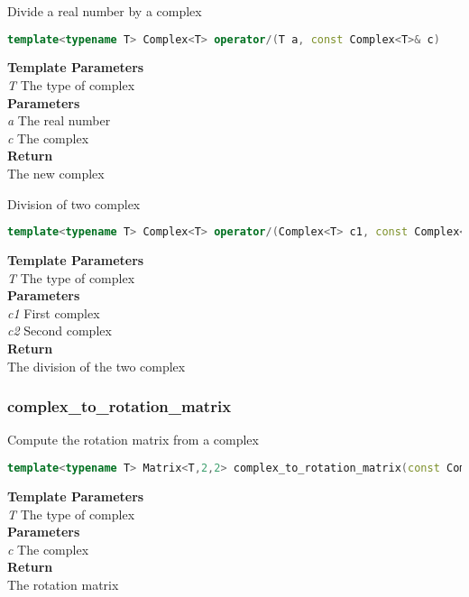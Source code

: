 \begin{mdframed}
Divide a real number by a complex
\begin{lstlisting}[language=C++]
template<typename T> Complex<T> operator/(T a, const Complex<T>& c) 
\end{lstlisting}
\textbf{Template Parameters} \\ 
\textit{T} The type of complex \\ 
\textbf{Parameters} \\ 
\textit{a} The real number \\ 
\textit{c} The complex \\ 
\textbf{Return} \\ 
The new complex\\ 
\end{mdframed}

\begin{mdframed}
Division of two complex
\begin{lstlisting}[language=C++]
template<typename T> Complex<T> operator/(Complex<T> c1, const Complex<T>& c2) 
\end{lstlisting}
\textbf{Template Parameters} \\ 
\textit{T} The type of complex \\ 
\textbf{Parameters} \\ 
\textit{c1} First complex \\ 
\textit{c2} Second complex \\ 
\textbf{Return} \\ 
The division of the two complex\\ 
\end{mdframed}

\subsubsection{complex\_to\_rotation\_matrix}
\begin{mdframed}
Compute the rotation matrix from a complex
\begin{lstlisting}[language=C++]
template<typename T> Matrix<T,2,2> complex_to_rotation_matrix(const Complex<T>& c) 
\end{lstlisting}
\textbf{Template Parameters} \\ 
\textit{T} The type of complex \\ 
\textbf{Parameters} \\ 
\textit{c} The complex \\ 
\textbf{Return} \\ 
The rotation matrix\\ 
\end{mdframed}

